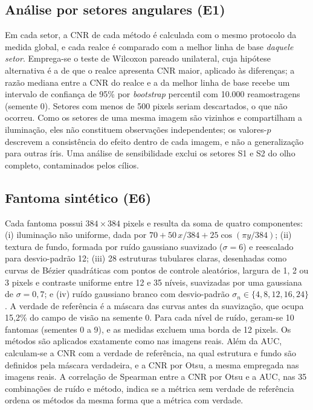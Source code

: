 \documentclass[12pt, oneside, a4paper, chapter=TITLE, section=TITLE,
               english, brazil]{abntex2}
\begin{document}
\subsection{Análise por setores angulares (E1)}

Em cada setor, a CNR de cada método é calculada com o mesmo protocolo da
medida global, e cada realce é comparado com a melhor linha de base
\emph{daquele setor}. Emprega-se o teste de Wilcoxon pareado unilateral, cuja
hipótese alternativa é a de que o realce apresenta CNR maior, aplicado às
diferenças; a razão mediana entre a CNR do realce e a da melhor linha de base
recebe um intervalo de confiança de 95\% por \emph{bootstrap} percentil com
10.000 reamostragens (semente 0). Setores com menos de 500 pixels seriam
descartados, o que não ocorreu. Como os setores de uma mesma imagem são
vizinhos e compartilham a iluminação, eles não constituem observações
independentes; os valores-$p$ descrevem a consistência do efeito dentro de
cada imagem, e não a generalização para outras íris. Uma análise de
sensibilidade exclui os setores S1 e S2 do olho completo, contaminados pelos
cílios.

\subsection{Fantoma sintético (E6)}
\label{sec:met-fantoma}

Cada fantoma possui $384 \times 384$ pixels e resulta da soma de quatro
componentes: (i) iluminação não uniforme, dada por
$70 + 50\,x/384 + 25\cos(\pi y/384)$; (ii) textura de fundo, formada por ruído
gaussiano suavizado ($\sigma = 6$) e reescalado para desvio-padrão 12;
(iii) 28 estruturas tubulares claras, desenhadas como curvas de Bézier
quadráticas com pontos de controle aleatórios, largura de 1, 2 ou 3 pixels e
contraste uniforme entre 12 e 35 níveis, suavizadas por uma gaussiana de
$\sigma = 0{,}7$; e (iv) ruído gaussiano branco com desvio-padrão
$\sigma_n \in \{4, 8, 12, 16, 24\}$. A verdade de referência é a máscara das
curvas antes da suavização, que ocupa 15,2\% do campo de visão na semente 0.
Para cada nível de ruído, geram-se 10 fantomas (sementes 0 a 9), e as medidas
excluem uma borda de 12 pixels. Os métodos são aplicados exatamente como nas
imagens reais. Além da AUC, calculam-se a CNR com a verdade de referência, na
qual estrutura e fundo são definidos pela máscara verdadeira, e a CNR por
Otsu, a mesma empregada nas imagens reais. A correlação de Spearman entre a
CNR por Otsu e a AUC, nas 35 combinações de ruído e método, indica se a
métrica sem verdade de referência ordena os métodos da mesma forma que a
métrica com verdade.
\end{document}
